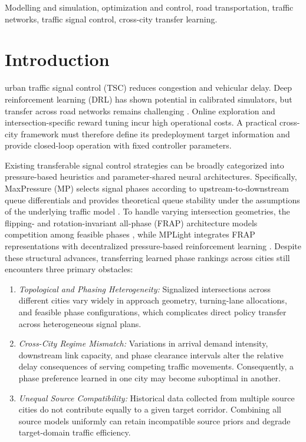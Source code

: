 \documentclass[letterpaper,journal]{IEEEtran}
\begin{document}
\begin{IEEEkeywords}
Modelling and simulation, optimization and control, road transportation, traffic networks, traffic signal control, cross-city transfer learning.
\end{IEEEkeywords}

\section{Introduction}
\label{sec:intro}

 urban traffic signal control (TSC) reduces congestion and vehicular delay. Deep reinforcement learning (DRL) has shown potential in calibrated simulators, but transfer across road networks remains challenging \cite{wei2019presslight,chen2020thousandlights}. Online exploration and intersection-specific reward tuning incur high operational costs. A practical cross-city framework must therefore define its predeployment target information and provide closed-loop operation with fixed controller parameters.

Existing transferable signal control strategies can be broadly categorized into pressure-based heuristics and parameter-shared neural architectures. Specifically, MaxPressure (MP) selects signal phases according to upstream-to-downstream queue differentials and provides theoretical queue stability under the assumptions of the underlying traffic model \cite{varaiya2013maxpressure}. To handle varying intersection geometries, the flipping- and rotation-invariant all-phase (FRAP) architecture models competition among feasible phases \cite{zheng2019frap}, while MPLight integrates FRAP representations with decentralized pressure-based reinforcement learning \cite{chen2020thousandlights}. Despite these structural advances, transferring learned phase rankings across cities still encounters three primary obstacles:
\begin{enumerate}
    \item \textit{Topological and Phasing Heterogeneity:} Signalized intersections across different cities vary widely in approach geometry, turning-lane allocations, and feasible phase configurations, which complicates direct policy transfer across heterogeneous signal plans.
    \item \textit{Cross-City Regime Mismatch:} Variations in arrival demand intensity, downstream link capacity, and phase clearance intervals alter the relative delay consequences of serving competing traffic movements. Consequently, a phase preference learned in one city may become suboptimal in another.
    \item \textit{Unequal Source Compatibility:} Historical data collected from multiple source cities do not contribute equally to a given target corridor. Combining all source models uniformly can retain incompatible source priors and degrade target-domain traffic efficiency.
\end{enumerate}
\end{document}
